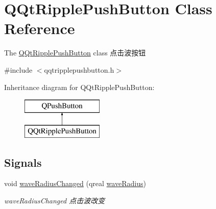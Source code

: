 \hypertarget{class_q_qt_ripple_push_button}{}\section{Q\+Qt\+Ripple\+Push\+Button Class Reference}
\label{class_q_qt_ripple_push_button}


The \mbox{\hyperlink{class_q_qt_ripple_push_button}{Q\+Qt\+Ripple\+Push\+Button}} class 点击波按钮  




{\ttfamily \#include $<$qqtripplepushbutton.\+h$>$}

Inheritance diagram for Q\+Qt\+Ripple\+Push\+Button\+:\begin{figure}[H]
\begin{center}
\leavevmode
\includegraphics[height=2.000000cm]{class_q_qt_ripple_push_button}
\end{center}
\end{figure}
\subsection*{Signals}
\begin{DoxyCompactItemize}
\item 
\mbox{\label{class_q_qt_ripple_push_button_a0dfb4b0828c07c23274795127f8f51d9}} 
void \mbox{\hyperlink{class_q_qt_ripple_push_button_a0dfb4b0828c07c23274795127f8f51d9}{wave\+Radius\+Changed}} (qreal \mbox{\hyperlink{class_q_qt_ripple_push_button_abce7723d0877a018914d0be47f51a03c}{wave\+Radius}})
\begin{DoxyCompactList}\small\item\em wave\+Radius\+Changed 点击波改变 \end{DoxyCompactList}\end{DoxyCompactItemize}
